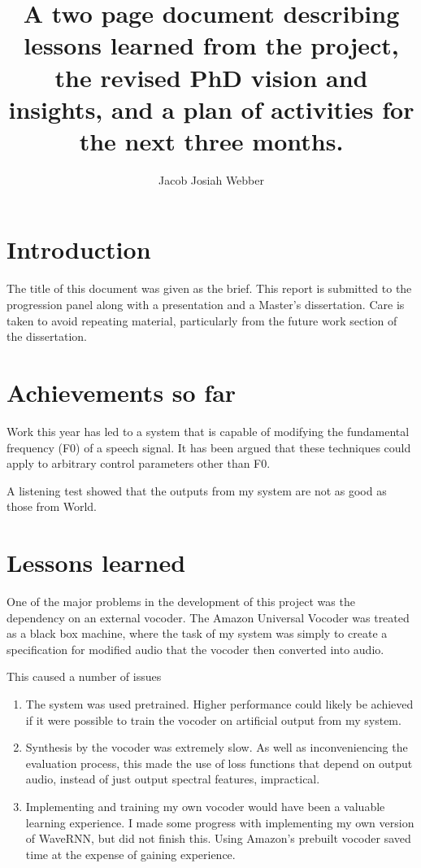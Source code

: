 \documentclass[11pt,a4paper]{article}
\author{Jacob Josiah Webber}
\title{A two page document describing lessons learned from the project, the  
revised PhD vision and insights, and a plan of activities for the next  
three months.}
\begin{document}
\maketitle
\section{Introduction}

The title of this document was given as the brief. This report is submitted to the progression panel along with a presentation and a Master's dissertation. Care is taken to avoid repeating material, particularly from the future work section of the dissertation.

\section{Achievements so far}

Work this year has led to a system that is capable of modifying the fundamental frequency (F0) of a speech signal. It has been argued that these techniques could apply to arbitrary control parameters other than F0.

A listening test showed that the outputs from my system are not as good as those from World.

\section{Lessons learned}

One of the major problems in the development of this project was the dependency on an external vocoder. The Amazon Universal Vocoder was treated as a black box machine, where the task of my system was simply to create a specification for modified audio that the vocoder then converted into audio.

This caused a number of issues

\begin{enumerate}
    \item The system was used pretrained. Higher performance could likely be achieved if it were possible to train the vocoder on artificial output from my system.
    
    \item Synthesis by the vocoder was extremely slow. As well as inconveniencing the evaluation process, this made the use of loss functions that depend on output audio, instead of just output spectral features, impractical.
    
    \item Implementing and training my own vocoder would have been a valuable learning experience. I made some progress with implementing my own version of WaveRNN, but did not finish this. Using Amazon's prebuilt vocoder saved time at the expense of gaining experience.
\end{enumerate}
\end{document}
